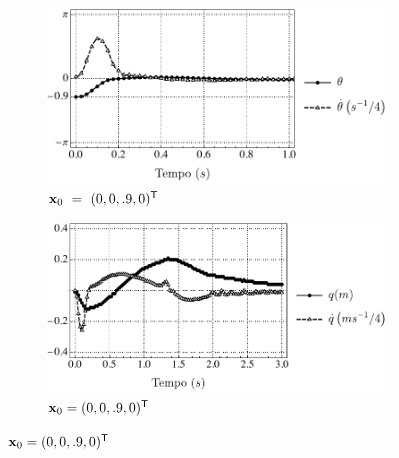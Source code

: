 \begin{figure}
    \centering
    \begin{subfigure}[t]{0.48\textwidth}
        \centering
        \includegraphics[width=\textwidth]{assets/theta-limit-angle9}
        \caption{$\mathbf{x}_0~=~(0, 0, .9, 0)^{\mathsf{T}}$}
    \end{subfigure}
    \hfill
    \begin{subfigure}[t]{0.48\textwidth}
        \centering
        \includegraphics[width=\textwidth]{assets/theta-limit-pos9}
        \caption{$\mathbf{x}_0 = (0, 0, .9, 0)^{\mathsf{T}}$}
\end{subfigure}


\end{figure}
